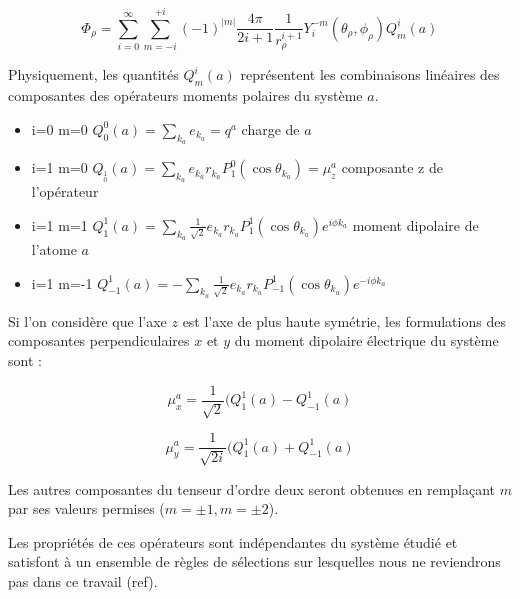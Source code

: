 	\begin{equation}
	\Phi_{\rho} = \sum_{i=0}^{\infty} \sum_{m=-i}^{+i} (-1)^{|m|} \frac{4\pi}{2i +1} \frac{1}{r_{\rho}^{i+1}} Y_{i}^{-m} (\theta_{\rho},\phi_{\rho})Q_{m}^{i}(a)
	\end{equation}
	
	Physiquement, les quantités $Q_{m}^{i}(a)$ représentent les combinaisons linéaires des composantes des opérateurs moments polaires du système $a$. 
	
	\begin{itemize}
		\item i=0 m=0 \hspace{0.9cm} $Q_{0}^{0}(a) = \sum_{k_{a}} e_{k_{a}} = q^{a}$ \hspace{3.5cm} charge de $a$
		\item i=1 m=0 \hspace{0.9cm} $Q_{_{0}^{1}}(a)= \sum_{k_{a}} e_{k_{a}} r_{k_{a}} P^{0}_{1} (\cos\theta_{k_{a}}) = \mu_{z}^{a}$ \hspace{1cm} composante z de l'opérateur	\item i=1 m=1 \hspace{0.9cm} $Q_{1}^{1}(a)= \sum_{k_{a}} \frac{1}{\sqrt{2}}e_{k_{a}} r_{k_{a}} P^{1}_{1} (\cos\theta_{k_{a}}) e^{i\phi k_{a}}$ \hspace{0.6cm} moment dipolaire de l'atome $a$
		\item i=1 m=-1 \hspace{0.9cm} $Q_{-1}^{1}(a) = -\sum_{k_{a}} \frac{1}{\sqrt{2}}e_{k_{a}} r_{k_{a}} P^{1}_{-1} (\cos\theta_{k_{a}}) e^{-i\phi k_{a}}$
	\end{itemize}
	
	Si l'on considère que l'axe $z$ est l'axe de plus haute symétrie, les formulations des composantes perpendiculaires $x$ et $y$ du moment dipolaire électrique du système sont : 
	
	\begin{equation}
	\mu_{x}^{a} = \frac{1}{\sqrt{2}} (Q_{1}^{1}(a)- Q_{-1}^{1}(a)
	\end{equation}
	
	\begin{equation}
	\mu_{y}^{a} = \frac{1}{\sqrt{2i}} (Q_{1}^{1}(a)+ Q_{-1}^{1}(a)
	\end{equation}
	
	Les autres composantes du tenseur d'ordre deux seront obtenues en remplaçant $m$ par ses valeurs permises ($m=\pm 1, m=\pm 2$).
	
	Les propriétés de ces opérateurs sont indépendantes du système étudié et satisfont à un ensemble de règles de sélections sur lesquelles nous ne reviendrons pas dans ce travail (ref). 
	
